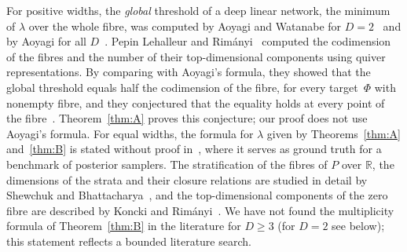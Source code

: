 \documentclass[11pt,a4paper]{article}
\theoremstyle{definition}
\theoremstyle{remark}
\numberwithin{equation}{section}
\newcommand{\R}{\mathbb{R}}
\begin{document}
For positive widths, the \emph{global} threshold of a deep linear network, the minimum of $\lambda$ over the whole fibre, was computed by Aoyagi and Watanabe for $D=2$~\cite{aoyagi-watanabe} and by Aoyagi for all $D$~\cite{aoyagi-2024}. Pepin Lehalleur and Rimányi~\cite{lehalleur-rimanyi} computed the codimension of the fibres and the number of their top-dimensional components using quiver representations. By comparing with Aoyagi's formula, they showed that the global threshold equals half the codimension of the fibre, for every target~$\Phi$ with nonempty fibre, and they conjectured that the equality holds at every point of the fibre~\cite[Remark~8.7]{lehalleur-rimanyi}. Theorem~\ref{thm:A} proves this conjecture; our proof does not use Aoyagi's formula. For equal widths, the formula for $\lambda$ given by Theorems~\ref{thm:A} and~\ref{thm:B} is stated without proof in~\cite[Appendix~B, Theorem~B.5]{hitchcock-hoogland}, where it serves as ground truth for a benchmark of posterior samplers. The stratification of the fibres of $P$ over $\R$, the dimensions of the strata and their closure relations are studied in detail by Shewchuk and Bhattacharya~\cite{shewchuk-bhattacharya}, and the top-dimensional components of the zero fibre are described by Koncki and Rimányi~\cite{koncki-rimanyi}. We have not found the multiplicity formula of Theorem~\ref{thm:B} in the literature for $D\ge3$ (for $D=2$ see below); this statement reflects a bounded literature search.
\end{document}
